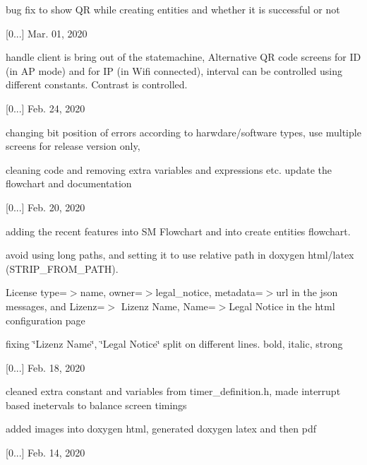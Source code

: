 \begin{DoxyItemize}
\begin{DoxyItemize}
\item bug fix to show QR while creating entities and whether it is successful or not
\end{DoxyItemize}
\item \mbox{[}0...\mbox{]} Mar. 01, 2020
\begin{DoxyItemize}
\item handle client is bring out of the statemachine, Alternative QR code screens for ID (in AP mode) and for IP (in Wifi connected), interval can be controlled using different constants. Contrast is controlled.
\end{DoxyItemize}
\item \mbox{[}0...\mbox{]} Feb. 24, 2020
\begin{DoxyItemize}
\item changing bit position of errors according to harwdare/software types, use multiple screens for release version only,
\item cleaning code and removing extra variables and expressions etc. update the flowchart and documentation
\end{DoxyItemize}
\item \mbox{[}0...\mbox{]} Feb. 20, 2020
\begin{DoxyItemize}
\item adding the recent features into SM Flowchart and into create entities flowchart.
\item avoid using long paths, and setting it to use relative path in doxygen html/latex (S\+T\+R\+I\+P\+\_\+\+F\+R\+O\+M\+\_\+\+P\+A\+TH).
\item License type=$>$name, owner=$>$legal\+\_\+notice, metadata=$>$url in the json messages, and Lizenz=$>$ Lizenz Name, Name=$>$Legal Notice in the html configuration page
\item fixing \char`\"{}\+Lizenz Name\char`\"{}, \char`\"{}\+Legal Notice\char`\"{} split on different lines. bold, italic, strong
\end{DoxyItemize}
\item \mbox{[}0...\mbox{]} Feb. 18, 2020
\begin{DoxyItemize}
\item cleaned extra constant and variables from timer\+\_\+definition.\+h, made interrupt based inetervals to balance screen timings
\item added images into doxygen html, generated doxygen latex and then pdf
\end{DoxyItemize}
\item \mbox{[}0...\mbox{]} Feb. 14, 2020

\end{DoxyItemize}
